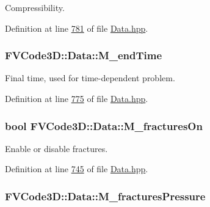 Compressibility. 



Definition at line \hyperlink{Data_8hpp_source_l00781}{781} of file \hyperlink{Data_8hpp_source}{Data.\+hpp}.

\subsubsection[{\texorpdfstring{M\+\_\+end\+Time}{M_endTime}}]{ F\+V\+Code3\+D\+::\+Data\+::\+M\+\_\+end\+Time\hspace{0.3cm}{\ttfamily [protected]}}\hypertarget{classFVCode3D_1_1Data_ad0db1011dedc7485e6b4393c872506c0}{}\label{classFVCode3D_1_1Data_ad0db1011dedc7485e6b4393c872506c0}


Final time, used for time-\/dependent problem. 



Definition at line \hyperlink{Data_8hpp_source_l00775}{775} of file \hyperlink{Data_8hpp_source}{Data.\+hpp}.

\subsubsection[{\texorpdfstring{M\+\_\+fractures\+On}{M_fracturesOn}}]{\setlength{\rightskip}{0pt plus 5cm}bool F\+V\+Code3\+D\+::\+Data\+::\+M\+\_\+fractures\+On\hspace{0.3cm}{\ttfamily [protected]}}\hypertarget{classFVCode3D_1_1Data_ab0b504d3e6e8ab604d4567eceb178aa7}{}\label{classFVCode3D_1_1Data_ab0b504d3e6e8ab604d4567eceb178aa7}


Enable or disable fractures. 



Definition at line \hyperlink{Data_8hpp_source_l00745}{745} of file \hyperlink{Data_8hpp_source}{Data.\+hpp}.

\subsubsection[{\texorpdfstring{M\+\_\+fractures\+Pressure}{M_fracturesPressure}}]{ F\+V\+Code3\+D\+::\+Data\+::\+M\+\_\+fractures\+Pressure\hspace{0.3cm}{\ttfamily [protected]}}\hypertarget{classFVCode3D_1_1Data_af04c830d4b03507186fbd36ad0ffcb2c}{}\label{classFVCode3D_1_1Data_af04c830d4b03507186fbd36ad0ffcb2c}


